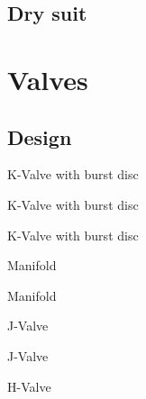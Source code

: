 \documentclass[aspectratio=1610,english,12pt]{beamer}
\begin{document}
\subsection{Dry suit}
\begin{frame}{\insertsubsection}
\end{frame}

\begin{frame}{\insertsubsection}
\end{frame}

\section{Valves}

\subsection{Design}

\begin{frame}{K-Valve with burst disc}
\end{frame}

\begin{frame}{K-Valve with burst disc}
\end{frame}

\begin{frame}{K-Valve with burst disc}
\end{frame}

\begin{frame}{Manifold}
\end{frame}

\begin{frame}{Manifold}
\end{frame}

\begin{frame}{J-Valve}
\end{frame}

\begin{frame}{J-Valve}
\end{frame}

\begin{frame}{H-Valve}
\end{frame}
\end{document}
